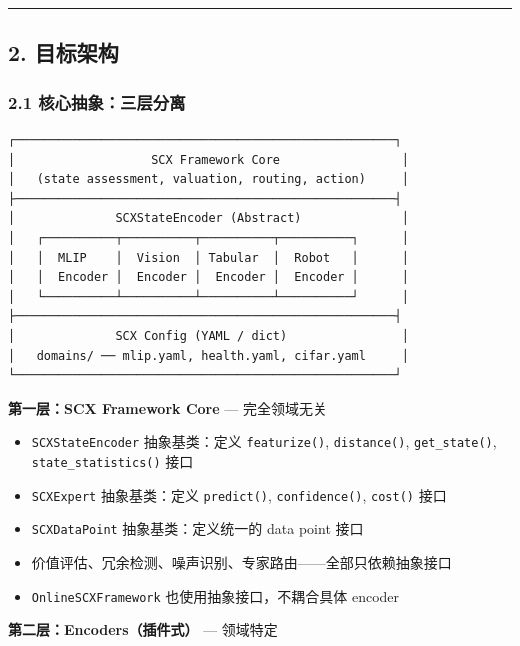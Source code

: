 \documentclass[
  12pt,
]{ctexart}
\providecommand{\tightlist}{%
  \setlength{\itemsep}{0pt}\setlength{\parskip}{0pt}}
\begin{document}
\begin{center}\rule{0.5\linewidth}{0.5pt}\end{center}

\subsection{2. 目标架构}\label{ux76eeux6807ux67b6ux6784}

\subsubsection{2.1
核心抽象：三层分离}\label{ux6838ux5fc3ux62bdux8c61ux4e09ux5c42ux5206ux79bb}

\begin{verbatim}
┌─────────────────────────────────────────────────────┐
│                   SCX Framework Core                 │
│   (state assessment, valuation, routing, action)     │
├─────────────────────────────────────────────────────┤
│              SCXStateEncoder (Abstract)              │
│   ┌──────────┬──────────┬──────────┬──────────┐      │
│   │  MLIP    │  Vision  │ Tabular  │  Robot   │      │
│   │  Encoder │  Encoder │  Encoder │  Encoder │      │
│   └──────────┴──────────┴──────────┴──────────┘      │
├─────────────────────────────────────────────────────┤
│              SCX Config (YAML / dict)                │
│   domains/ ── mlip.yaml, health.yaml, cifar.yaml     │
└─────────────────────────────────────────────────────┘
\end{verbatim}

\textbf{第一层：SCX Framework Core} --- 完全领域无关

\begin{itemize}
\tightlist
\item
  \texttt{SCXStateEncoder} 抽象基类：定义 \texttt{featurize()},
  \texttt{distance()}, \texttt{get\_state()},
  \texttt{state\_statistics()} 接口
\item
  \texttt{SCXExpert} 抽象基类：定义 \texttt{predict()},
  \texttt{confidence()}, \texttt{cost()} 接口
\item
  \texttt{SCXDataPoint} 抽象基类：定义统一的 data point 接口
\item
  价值评估、冗余检测、噪声识别、专家路由------全部只依赖抽象接口
\item
  \texttt{OnlineSCXFramework} 也使用抽象接口，不耦合具体 encoder
\end{itemize}

\textbf{第二层：Encoders（插件式）} --- 领域特定
\end{document}
